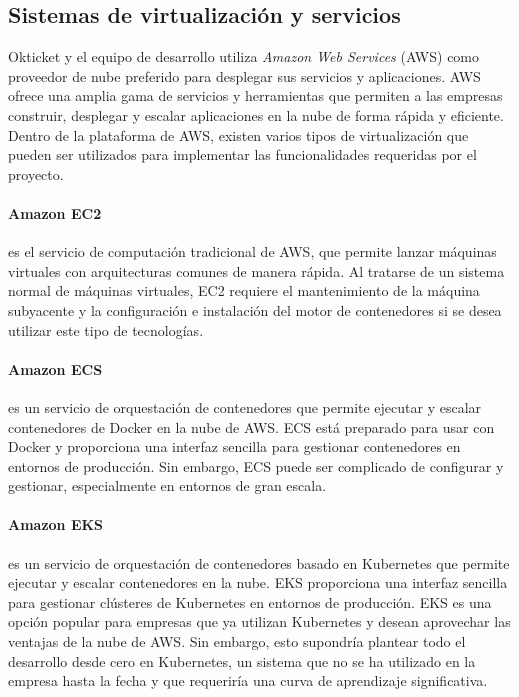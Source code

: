 \newpage{}
\subsection{Sistemas de virtualización y servicios}\label{subsec:alt_servicios}
Okticket y el equipo de desarrollo utiliza \textit{Amazon Web Services} (AWS)
como proveedor de nube preferido para desplegar sus servicios y aplicaciones.
AWS ofrece una amplia gama de servicios y herramientas que permiten a las
empresas construir, desplegar y escalar aplicaciones en la nube de forma rápida
y eficiente. Dentro de la plataforma de AWS, existen varios tipos de
virtualización que pueden ser utilizados para implementar las funcionalidades
requeridas por el proyecto.

\paragraph{Amazon EC2} es el servicio de computación tradicional de AWS, que
permite lanzar máquinas virtuales con arquitecturas comunes de manera rápida.
Al tratarse de un sistema normal de máquinas virtuales, EC2 requiere el
mantenimiento de la máquina subyacente y la configuración e instalación del
motor de contenedores si se desea utilizar este tipo de tecnologías.

\paragraph{Amazon ECS} es un servicio de orquestación de contenedores que
permite ejecutar y escalar contenedores de Docker en la nube de AWS. ECS está
preparado para usar con Docker y proporciona una interfaz sencilla para
gestionar contenedores en entornos de producción. Sin embargo, ECS puede ser
complicado de configurar y gestionar, especialmente en entornos de gran escala.

\paragraph{Amazon EKS} es un servicio de orquestación de contenedores basado
en Kubernetes que permite ejecutar y escalar contenedores en la nube. EKS
proporciona una interfaz sencilla para gestionar clústeres de Kubernetes en
entornos de producción. EKS es una opción
popular para empresas que ya utilizan Kubernetes y desean aprovechar las
ventajas de la nube de AWS. Sin embargo, esto supondría plantear todo el
desarrollo desde cero en Kubernetes, un sistema que no se ha utilizado en la
empresa hasta la fecha y que requeriría una curva de aprendizaje significativa.

